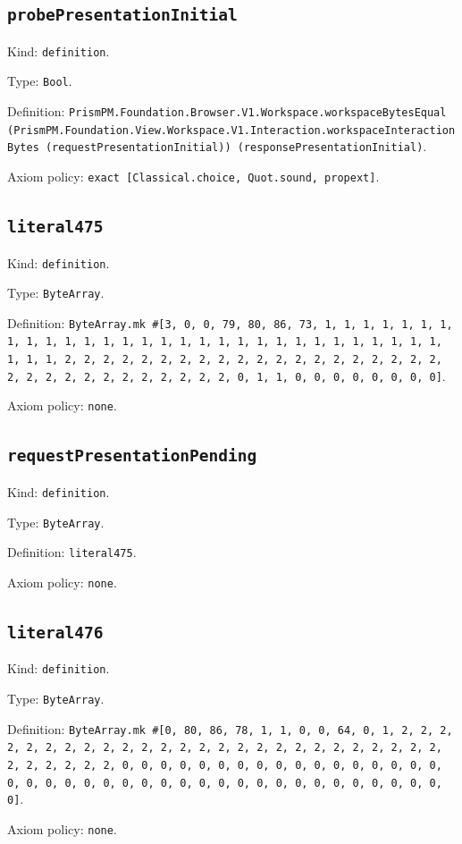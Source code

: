 \documentclass[11pt]{article}
\begin{document}
\subsection*{\texttt{probePresentationInitial}}
\noindent Kind: \texttt{definition}.\par
\noindent Type: \texttt{Bool}.\par
\noindent Definition: \texttt{PrismPM.Foundation.Browser.V1.Workspace.workspaceBytesEqual (PrismPM.Foundation.View.Workspace.V1.Interaction.workspaceInteractionBytes (requestPresentationInitial)) (responsePresentationInitial)}.\par
\noindent Axiom policy: \texttt{exact [Classical.choice, Quot.sound, propext]}.\par
\subsection*{\texttt{literal475}}
\noindent Kind: \texttt{definition}.\par
\noindent Type: \texttt{ByteArray}.\par
\noindent Definition: \texttt{ByteArray.mk \#[3, 0, 0, 79, 80, 86, 73, 1, 1, 1, 1, 1, 1, 1, 1, 1, 1, 1, 1, 1, 1, 1, 1, 1, 1, 1, 1, 1, 1, 1, 1, 1, 1, 1, 1, 1, 1, 1, 1, 1, 2, 2, 2, 2, 2, 2, 2, 2, 2, 2, 2, 2, 2, 2, 2, 2, 2, 2, 2, 2, 2, 2, 2, 2, 2, 2, 2, 2, 2, 2, 2, 2, 0, 1, 1, 0, 0, 0, 0, 0, 0, 0, 0]}.\par
\noindent Axiom policy: \texttt{none}.\par
\subsection*{\texttt{requestPresentationPending}}
\noindent Kind: \texttt{definition}.\par
\noindent Type: \texttt{ByteArray}.\par
\noindent Definition: \texttt{literal475}.\par
\noindent Axiom policy: \texttt{none}.\par
\subsection*{\texttt{literal476}}
\noindent Kind: \texttt{definition}.\par
\noindent Type: \texttt{ByteArray}.\par
\noindent Definition: \texttt{ByteArray.mk \#[0, 80, 86, 78, 1, 1, 0, 0, 64, 0, 1, 2, 2, 2, 2, 2, 2, 2, 2, 2, 2, 2, 2, 2, 2, 2, 2, 2, 2, 2, 2, 2, 2, 2, 2, 2, 2, 2, 2, 2, 2, 2, 2, 0, 0, 0, 0, 0, 0, 0, 0, 0, 0, 0, 0, 0, 0, 0, 0, 0, 0, 0, 0, 0, 0, 0, 0, 0, 0, 0, 0, 0, 0, 0, 0, 0, 0, 0, 0, 0, 0, 0, 0, 0]}.\par
\noindent Axiom policy: \texttt{none}.\par
\end{document}
